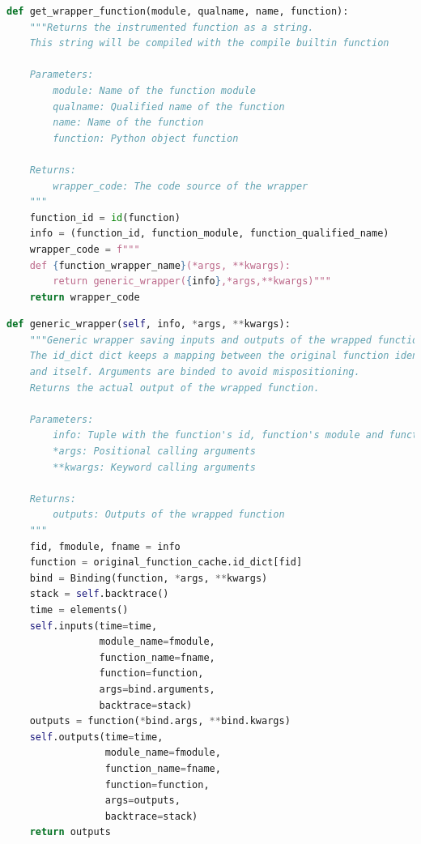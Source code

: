 \documentclass[11pt]{article}
\newcommand{\pytracer}[0]{PyTracer\xspace}
\begin{document}
\begin{listing}
    \centering
\begin{lstlisting}[language=Python,style=customPython]
def get_wrapper_function(module, qualname, name, function):
    """Returns the instrumented function as a string.
    This string will be compiled with the compile builtin function
    
    Parameters:
        module: Name of the function module
        qualname: Qualified name of the function
        name: Name of the function
        function: Python object function
        
    Returns:
        wrapper_code: The code source of the wrapper
    """
    function_id = id(function)
    info = (function_id, function_module, function_qualified_name)
    wrapper_code = f"""
    def {function_wrapper_name}(*args, **kwargs):
        return generic_wrapper({info},*args,**kwargs)"""
    return wrapper_code
\end{lstlisting}
    \caption{Function to create the instrumented version of a function.
    \pytracer uses the identifier of the function instead of the 
    actual function to handle aliases and avoid duplicate instrumentation.}
    \label{fig:wrapper_creation}
\end{listing}


\begin{listing}
    \centering
\begin{lstlisting}[language=Python,style=customPython,]
def generic_wrapper(self, info, *args, **kwargs):
    """Generic wrapper saving inputs and outputs of the wrapped function.
    The id_dict dict keeps a mapping between the original function identifier
    and itself. Arguments are binded to avoid mispositioning.
    Returns the actual output of the wrapped function.
    
    Parameters:
        info: Tuple with the function's id, function's module and function's name
        *args: Positional calling arguments
        **kwargs: Keyword calling arguments
    
    Returns:
        outputs: Outputs of the wrapped function
    """
    fid, fmodule, fname = info
    function = original_function_cache.id_dict[fid]
    bind = Binding(function, *args, **kwargs)
    stack = self.backtrace()
    time = elements()
    self.inputs(time=time,
                module_name=fmodule,
                function_name=fname,
                function=function,
                args=bind.arguments,
                backtrace=stack)
    outputs = function(*bind.args, **bind.kwargs)
    self.outputs(time=time,
                 module_name=fmodule,
                 function_name=fname,
                 function=function,
                 args=outputs,
                 backtrace=stack)
    return outputs
\end{lstlisting}
    \caption{\pytracer's generic wrapper function that saves
    the inputs and outputs of the wrapped function.}
    \label{fig:generic_wrapper}
\end{listing}
\end{document}
